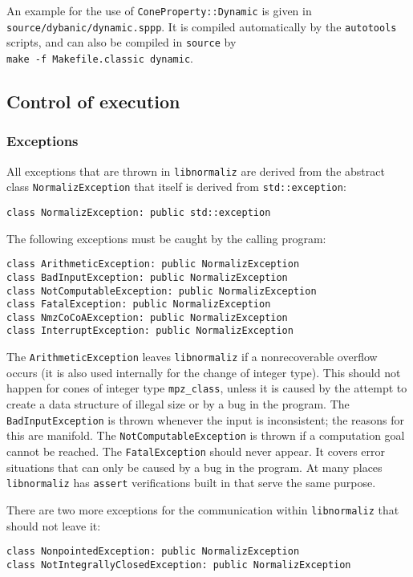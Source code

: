 \documentclass[12pt,a4paper]{scrartcl}
\theoremstyle{definition}
\begin{document}
\begin{small}
An example for the use of \verb|ConeProperty::Dynamic| is given in \verb|source/dybanic/dynamic.sppp|. It is compiled automatically by the \verb|autotools| scripts, and can also be compiled in \verb|source| by\\ \verb|make -f Makefile.classic dynamic|.

\subsection{Control of execution}

\subsubsection{Exceptions}

All exceptions that are thrown in \verb|libnormaliz| are derived from the abstract class \verb|NormalizException| that itself is derived from \verb|std::exception|:
\begin{Verbatim}
class NormalizException: public std::exception
\end{Verbatim}

The following exceptions must be caught by the calling program:
\begin{Verbatim}
class ArithmeticException: public NormalizException
class BadInputException: public NormalizException
class NotComputableException: public NormalizException
class FatalException: public NormalizException
class NmzCoCoAException: public NormalizException
class InterruptException: public NormalizException
\end{Verbatim}

The \verb|ArithmeticException| leaves \verb|libnormaliz| if a nonrecoverable overflow occurs (it is also used internally for the change of integer type). This should not happen for cones of integer type \verb|mpz_class|, unless it is caused by the attempt to create a data structure of illegal size or by a bug in the program. The \verb|BadInputException| is thrown whenever the input is inconsistent; the reasons for this are manifold. The \verb|NotComputableException| is thrown if a computation goal cannot be reached. The \verb|FatalException| should never appear. It covers error situations that can only be caused by a bug in the program. At many places \verb|libnormaliz| has \verb|assert| verifications built in that serve the same purpose. 

There are two more exceptions for the communication within \verb|libnormaliz| that should not leave it:
\begin{Verbatim}
class NonpointedException: public NormalizException 
class NotIntegrallyClosedException: public NormalizException
\end{Verbatim}


\end{small}
\end{document}

